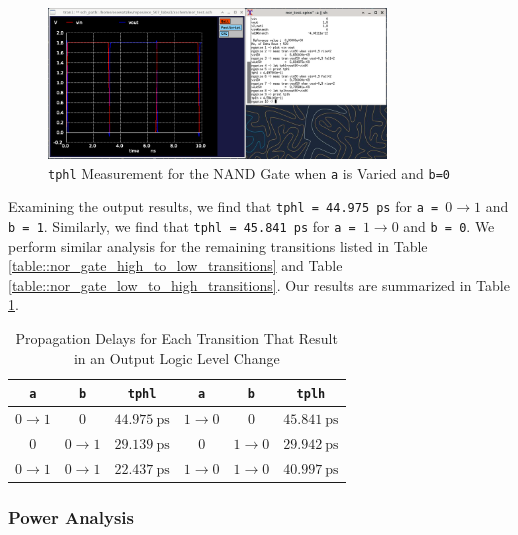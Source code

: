 \documentclass[fleqn]{article}
\begin{document}
	\begin{figure}[H]
		\centerline{\includegraphics[width=0.8\textwidth]{nor_delay_sweep_va.png}}
		\caption{\texttt{tphl} Measurement for the NAND Gate when \texttt{a} is Varied and \texttt{b=0}}
		\label{fig::nor_delay_sweep_va}
	\end{figure}
	
	Examining the output results, we find that \texttt{tphl = 44.975 ps} for \texttt{a = }$0 \rightarrow 1$ and \texttt{b = 1}. Similarly, we find that \texttt{tphl = 45.841 ps} for \texttt{a = }$1 \rightarrow 0$ and \texttt{b = 0}. We perform similar analysis for the remaining transitions listed in Table \ref{table::nor_gate_high_to_low_transitions} and Table \ref{table::nor_gate_low_to_high_transitions}. Our results are summarized in Table \ref{table::nor_gate_delay_analysis}.
	
	\begin{table}[H]
	\begin{center}
	\caption{Propagation Delays for Each Transition That Result in an Output Logic Level Change}
	\label{table::nor_gate_delay_analysis}
	\begin{tabular}{| c | c | c || c | c | c |}
		\hline
		\texttt{a} & \texttt{b} & \texttt{tphl} & \texttt{a} & \texttt{b} & \texttt{tplh} \\
		\hline	
		$0 \rightarrow 1$ & $0$ & $44.975\ \text{ps}$ & $1 \rightarrow 0$ & $0$ & $45.841\ \text{ps}$\\
		\hline	
		$0$ & $0 \rightarrow 1$ & $29.139\ \text{ps}$ & $0$ & $1 \rightarrow 0$ & $29.942\ \text{ps}$\\
		\hline	
		$0 \rightarrow 1$ & $0 \rightarrow 1$ & $22.437\ \text{ps}$ & $1 \rightarrow 0$ & $1 \rightarrow 0$ & $40.997\ \text{ps}$\\
		\hline
	\end{tabular}
	\end{center}
	\end{table}
	
	\subsubsection{Power Analysis}
	
\end{document}
